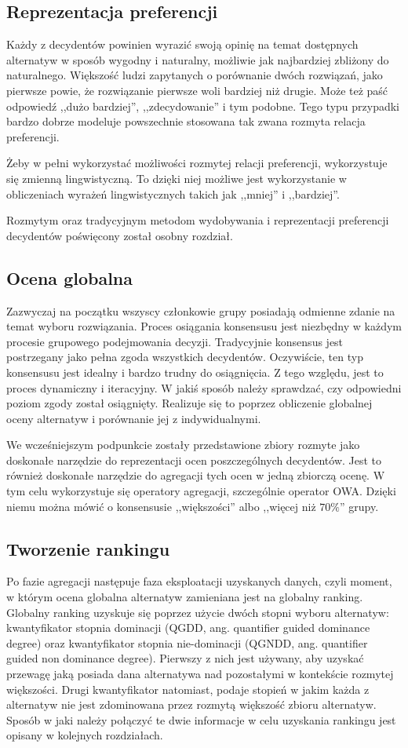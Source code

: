 \subsection{Reprezentacja preferencji}
Każdy z decydentów powinien wyrazić swoją opinię na temat dostępnych alternatyw 
w sposób wygodny i naturalny, możliwie jak najbardziej zbliżony do naturalnego. 
Większość ludzi zapytanych o porównanie dwóch rozwiązań, jako pierwsze powie, 
że rozwiązanie pierwsze woli bardziej niż drugie. Może też paść odpowiedź ,,dużo
bardziej'', ,,zdecydowanie'' i tym podobne. Tego typu przypadki bardzo dobrze
modeluje powszechnie stosowana tak zwana rozmyta relacja preferencji.

Żeby w pełni wykorzystać możliwości rozmytej relacji preferencji, wykorzystuje 
się zmienną lingwistyczną. To dzięki niej możliwe jest wykorzystanie w 
obliczeniach wyrażeń lingwistycznych takich jak ,,mniej'' i ,,bardziej''.

Rozmytym oraz tradycyjnym metodom wydobywania i reprezentacji preferencji 
decydentów poświęcony został osobny rozdział.

\subsection{Ocena globalna}
Zazwyczaj na początku wszyscy członkowie grupy posiadają odmienne zdanie na 
temat wyboru rozwiązania. Proces osiągania konsensusu jest niezbędny w każdym 
procesie grupowego podejmowania decyzji. Tradycyjnie konsensus jest postrzegany 
jako pełna zgoda wszystkich decydentów. Oczywiście, ten typ konsensusu jest 
idealny i bardzo trudny do osiągnięcia. Z tego względu, jest to proces 
dynamiczny i iteracyjny. W jakiś sposób należy sprawdzać, czy odpowiedni poziom 
zgody został osiągnięty. Realizuje się to poprzez obliczenie globalnej oceny 
alternatyw i porównanie jej z indywidualnymi.

We wcześniejszym podpunkcie zostały przedstawione zbiory rozmyte jako doskonałe
narzędzie do reprezentacji ocen poszczególnych decydentów. Jest to również
doskonałe narzędzie do agregacji tych ocen w jedną zbiorczą ocenę. W tym celu
wykorzystuje się operatory agregacji, szczególnie operator OWA. Dzięki niemu
można mówić o konsensusie ,,większości'' albo ,,więcej niż $70\%$''
grupy.

\subsection{Tworzenie rankingu}
Po fazie agregacji następuje faza eksploatacji uzyskanych danych, czyli moment,
w którym ocena globalna alternatyw zamieniana jest na globalny ranking. Globalny
ranking uzyskuje się poprzez użycie dwóch stopni wyboru alternatyw:
kwantyfikator stopnia dominacji (QGDD, ang. quantifier guided dominance degree)
oraz kwantyfikator stopnia nie-dominacji (QGNDD, ang. quantifier guided non
dominance degree). Pierwszy z nich jest używany, aby uzyskać przewagę jaką
posiada dana alternatywa nad pozostałymi w kontekście rozmytej większości. Drugi
kwantyfikator natomiast, podaje stopień w jakim każda z alternatyw nie jest
zdominowana przez rozmytą większość zbioru alternatyw. Sposób w jaki należy
połączyć te dwie informacje w celu uzyskania rankingu jest opisany w kolejnych
rozdziałach.
